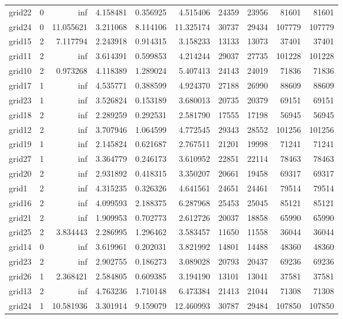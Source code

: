 \begin{longtable}{|l|r|r|r|r|r|r|r|r|r|}
grid22 & 0 & inf & 4.158481 & 0.356925 & 4.515406 & 24359 & 23956 & 81601 & 81601 \\
grid24 & 0 & 11.055621 & 3.211068 & 8.114106 & 11.325174 & 30737 & 29434 & 107779 & 107779 \\
grid15 & 2 & 7.117794 & 2.243918 & 0.914315 & 3.158233 & 13133 & 13073 & 37401 & 37401 \\
grid11 & 2 & inf & 3.614391 & 0.599853 & 4.214244 & 29037 & 27735 & 101228 & 101228 \\
grid10 & 2 & 0.973268 & 4.118389 & 1.289024 & 5.407413 & 24143 & 24019 & 71836 & 71836 \\
grid17 & 1 & inf & 4.535771 & 0.388599 & 4.924370 & 27188 & 26990 & 88609 & 88609 \\
grid23 & 1 & inf & 3.526824 & 0.153189 & 3.680013 & 20735 & 20379 & 69151 & 69151 \\
grid18 & 2 & inf & 2.289259 & 0.292531 & 2.581790 & 17555 & 17198 & 56945 & 56945 \\
grid12 & 2 & inf & 3.707946 & 1.064599 & 4.772545 & 29343 & 28552 & 101256 & 101256 \\
grid19 & 1 & inf & 2.145824 & 0.621687 & 2.767511 & 21201 & 19998 & 71241 & 71241 \\
grid27 & 1 & inf & 3.364779 & 0.246173 & 3.610952 & 22851 & 22114 & 78463 & 78463 \\
grid20 & 2 & inf & 2.931892 & 0.418315 & 3.350207 & 20661 & 19458 & 69317 & 69317 \\
grid1 & 2 & inf & 4.315235 & 0.326326 & 4.641561 & 24651 & 24461 & 79514 & 79514 \\
grid16 & 2 & inf & 4.099593 & 2.188375 & 6.287968 & 25453 & 25045 & 85121 & 85121 \\
grid21 & 2 & inf & 1.909953 & 0.702773 & 2.612726 & 20037 & 18858 & 65990 & 65990 \\
grid25 & 2 & 3.834443 & 2.286995 & 1.296462 & 3.583457 & 11650 & 11558 & 36044 & 36044 \\
grid14 & 0 & inf & 3.619961 & 0.202031 & 3.821992 & 14801 & 14488 & 48360 & 48360 \\
grid23 & 2 & inf & 2.902755 & 0.186273 & 3.089028 & 20793 & 20437 & 69236 & 69236 \\
grid26 & 1 & 2.368421 & 2.584805 & 0.609385 & 3.194190 & 13101 & 13041 & 37581 & 37581 \\
grid13 & 2 & inf & 4.763236 & 1.710148 & 6.473384 & 21413 & 21044 & 71308 & 71308 \\
grid24 & 1 & 10.581936 & 3.301914 & 9.159079 & 12.460993 & 30787 & 29484 & 107850 & 107850 \\

\end{longtable}
